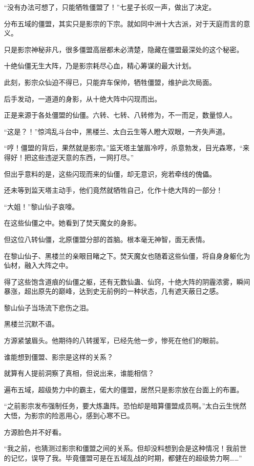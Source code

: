 \begin{this_body}
“没有办法可想了，只能牺牲僵盟了！”七星子长叹一声，做出了决定。

分布五域的僵盟，其实只是影宗的下宗。就如同中洲十大古派，对于天庭而言的意义。

只是影宗神秘非凡，很多僵盟高层都未必清楚，隐藏在僵盟最深处的这个秘密。

十绝仙僵无生大阵，乃是影宗耗尽心血，精心筹谋的最大计划。

此刻，影宗众仙迫不得已，只能弃车保帅，牺牲僵盟，维护此次局面。

后手发动，一道道的身影，从十绝大阵中闪现而出。

正是来源于各处僵盟的仙僵。六转、七转、八转修为，不一而足，数量惊人。

“这是？！”惊鸿乱斗台中，黑楼兰、太白云生等人瞪大双眼，一齐失声道。

“哼！僵盟的背后，果然就是影宗。”监天塔主皱眉冷哼，杀意勃发，目光森寒，“来得好！把这些违逆天意的东西，一网打尽。”

但出乎意料的是，这些闪现而来的仙僵，却无意识，宛若牵线的傀儡。

还未等到监天塔主动手，他们竟然就牺牲自己，化作十绝大阵的一部分！

“大姐！”黎山仙子哀嚎。

在这些仙僵之中。她看到了焚天魔女的身影。

但这位八转仙僵，北原僵盟分部的首脑。根本毫无神智，面无表情。

在黎山仙子、黑楼兰的亲眼目睹之下。焚天魔女也随着这些仙僵，将自身身躯化为仙材，融入大阵之中。

得了这些饱含道痕的仙僵之躯，还有无数仙蛊、仙窍，十绝大阵的阴霾浓雾，瞬间暴涨，超出原先的巅峰，达到史无前例的一种状态，几有遮天蔽日之感。

黎山仙子当场流下悲伤之泪。

黑楼兰沉默不语。

方源紧皱眉头。他期待的八转援军，已经先他一步，惨死在他们的眼前。

谁能想到僵盟、影宗是这样的关系？

就算有人提前洞察了真相，但说出来，谁能相信？

遍布五域，超级势力中的霸主，偌大的僵盟，居然只是影宗放在台面上的布置。

“之前影宗发布强制任务，要大炼蛊阵。恐怕却是暗算僵盟成员啊。”太白云生恍然大悟，为影宗的险恶用心，感到心寒不已。

方源脸色并不好看。

“我之前，也猜测过影宗和僵盟之间的关系。但却没料想到会是这种情况！我前世的记忆，误导了我。毕竟僵盟可是在五域乱战的时期，都健在的超级势力啊……”


\end{this_body}
